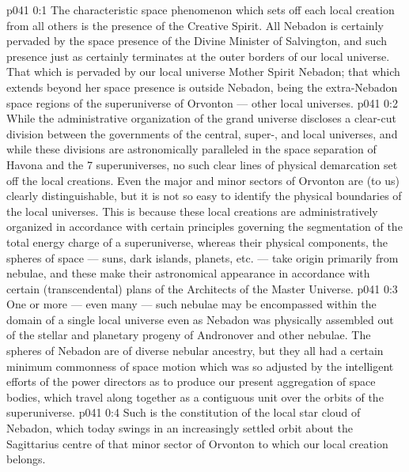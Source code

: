 \author{Archangel}
\vs p041 0:1 The characteristic space phenomenon which sets off each local creation from all others is the presence of the Creative Spirit. All Nebadon is certainly pervaded by the space presence of the Divine Minister of Salvington, and such presence just as certainly terminates at the outer borders of our local universe. That which is pervaded by our local universe Mother Spirit  Nebadon; that which extends beyond her space presence is outside Nebadon, being the extra\hyp{}Nebadon space regions of the superuniverse of Orvonton --- other local universes.
\vs p041 0:2 \pc While the administrative organization of the grand universe discloses a clear\hyp{}cut division between the governments of the central, super-, and local universes, and while these divisions are astronomically paralleled in the space separation of Havona and the 7 superuniverses, no such clear lines of physical demarcation set off the local creations. Even the major and minor sectors of Orvonton are (to us) clearly distinguishable, but it is not so easy to identify the physical boundaries of the local universes. This is because these local creations are administratively organized in accordance with certain  principles governing the segmentation of the total energy charge of a superuniverse, whereas their physical components, the spheres of space --- suns, dark islands, planets, etc. --- take origin primarily from nebulae, and these make their astronomical appearance in accordance with certain  (transcendental) plans of the Architects of the Master Universe.
\vs p041 0:3 One or more --- even many --- such nebulae may be encompassed within the domain of a single local universe even as Nebadon was physically assembled out of the stellar and planetary progeny of Andronover and other nebulae. The spheres of Nebadon are of diverse nebular ancestry, but they all had a certain minimum commonness of space motion which was so adjusted by the intelligent efforts of the power directors as to produce our present aggregation of space bodies, which travel along together as a contiguous unit over the orbits of the superuniverse.
\vs p041 0:4 Such is the constitution of the local star cloud of Nebadon, which today swings in an increasingly settled orbit about the Sagittarius centre of that minor sector of Orvonton to which our local creation belongs.
